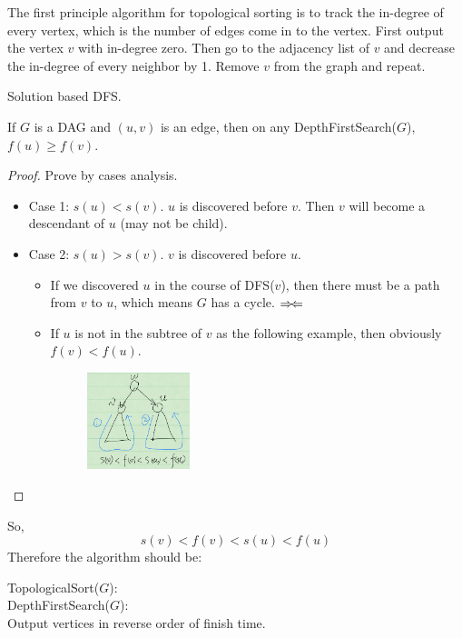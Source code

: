 The first principle algorithm for topological sorting is to track the in-degree 
of every vertex, which is the number of edges come in to the vertex. First 
output the vertex $v$ with in-degree zero. Then go to the adjacency list of $v$ and decrease the in-degree of every neighbor by 1. Remove $v$ from the graph and 
repeat.

Solution based DFS.
\begin{theorem}
 If $G$ is a DAG and $(u, v)$ is an edge, then on any DepthFirstSearch($G$), 
$f(u) \ge f(v)$.
\end{theorem}

\begin{proof}
Prove by cases analysis.
 \begin{itemize}
  \item Case 1: $s(u) < s(v)$. $u$ is discovered before $v$. Then $v$ will 
become a descendant of $u$ (may not be child).
  \item Case 2: $s(u) > s(v)$. $v$ is discovered before $u$. 
  \begin{itemize}
   \item If we discovered $u$ in the course of DFS($v$), then there must be 
a path from $v$ to $u$, which means $G$ has a cycle. 
$\Rightarrow\mskip-\thinmuskip\Leftarrow$
    \item If $u$ is not in the subtree of $v$ as the following example, 
then obviously $f(v) < f(u)$.
        \begin{figure}[H]
        \centering
        \includegraphics[width=0.3\textwidth]{dfs-s-f.png}
        \end{figure}
  \end{itemize}
 \end{itemize}
\end{proof}

So, \[s(v) < f(v) < s(u) < f(u)\]
Therefore the algorithm should be:

TopologicalSort($G$):\\
\tab\tab DepthFirstSearch($G$):\\
\tab\tab\tab\tab Output vertices in reverse order of finish time.

